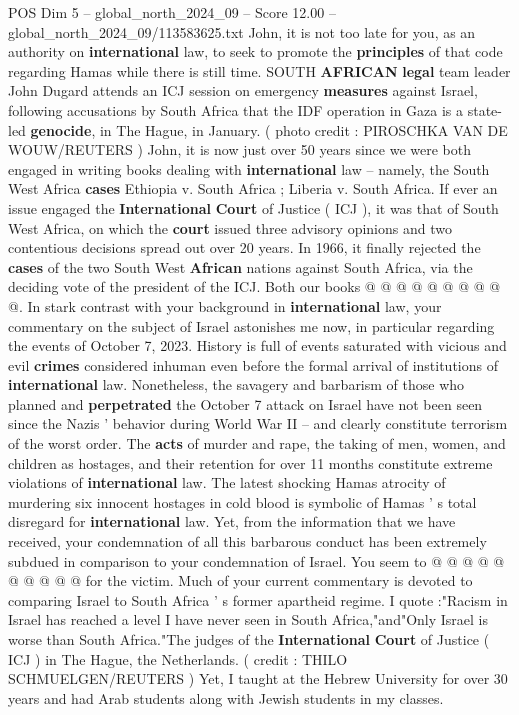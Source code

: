 \begin{textsample}{POS Dim 5 – global\_north\_2024\_09 – Score 12.00 – global\_north\_2024\_09/113583625.txt}  \label{ex:f5_pos_360}
John, it is not too late for you, as an authority on \textbf{international} law, to seek to promote the \textbf{principles} of that code regarding Hamas while there is still time.
SOUTH \textbf{AFRICAN} \textbf{legal} team leader John Dugard attends an ICJ session on emergency \textbf{measures} against Israel, following accusations by South Africa that the IDF operation in Gaza is a state-led \textbf{genocide}, in The Hague, in January. ( photo credit : PIROSCHKA VAN DE WOUW/REUTERS ) John, it is now just over 50 years since we were both engaged in writing books dealing with \textbf{international} law -- namely, the South West Africa \textbf{cases} Ethiopia v.
South Africa ; Liberia v.
South Africa.
If ever an issue engaged the \textbf{International} \textbf{Court} of Justice ( ICJ ), it was that of South West Africa, on which the \textbf{court} issued three advisory opinions and two contentious decisions spread out over 20 years.
In 1966, it finally rejected the \textbf{cases} of the two South West \textbf{African} nations against South Africa, via the deciding vote of the president of the ICJ.
Both our books @ @ @ @ @ @ @ @ @ @.
In stark contrast with your background in \textbf{international} law, your commentary on the subject of Israel astonishes me now, in particular regarding the events of October 7, 2023.
History is full of events saturated with vicious and evil \textbf{crimes} considered inhuman even before the formal arrival of institutions of \textbf{international} law.
Nonetheless, the savagery and barbarism of those who planned and \textbf{perpetrated} the October 7 attack on Israel have not been seen since the Nazis ' behavior during World War II -- and clearly constitute terrorism of the worst order.
The \textbf{acts} of murder and rape, the taking of men, women, and children as hostages, and their retention for over 11 months constitute extreme violations of \textbf{international} law.
The latest shocking Hamas atrocity of murdering six innocent hostages in cold blood is symbolic of Hamas ' s total disregard for \textbf{international} law.
Yet, from the information that we have received, your condemnation of all this barbarous conduct has been extremely subdued in comparison to your condemnation of Israel.
You seem to @ @ @ @ @ @ @ @ @ @ for the victim.
Much of your current commentary is devoted to comparing Israel to South Africa ' s former apartheid regime.
I quote :"Racism in Israel has reached a level I have never seen in South Africa,"and"Only Israel is worse than South Africa."The judges of the \textbf{International} \textbf{Court} of Justice ( ICJ ) in The Hague, the Netherlands. ( credit : THILO SCHMUELGEN/REUTERS ) Yet, I taught at the Hebrew University for over 30 years and had Arab students along with Jewish students in my classes.

\end{textsample}

